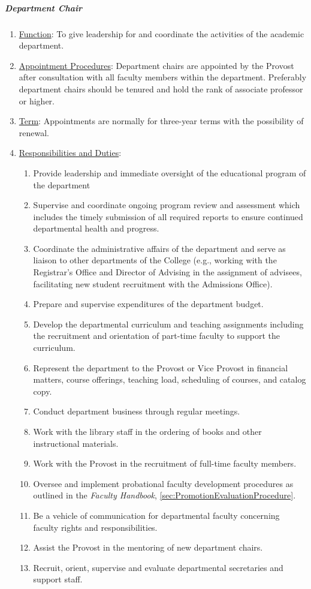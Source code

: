 				\subparagraph{Department Chair}
					\begin{enumerate}
						\item{\underline{Function}:  To give leadership for and coordinate the activities of the academic department.}
						\item{\underline{Appointment Procedures}:  Department chairs are appointed by the Provost after consultation with all faculty members within the department.  Preferably department chairs should be tenured and hold the rank of associate professor or higher.}
						\item{\underline{Term}:  Appointments are normally for three-year terms with the possibility of renewal.}
						\item{\underline{Responsibilities and Duties}:
							\begin{enumerate}
								\item{Provide leadership and immediate oversight of the educational program of the department}
								\item{Supervise and coordinate ongoing program review and assessment which includes the timely submission of all required reports to ensure continued departmental health and progress.}
								\item{Coordinate the administrative affairs of the department and serve as liaison to other departments of the College (e.g., working with the Registrar's Office and Director of Advising in the assignment of advisees, facilitating new student recruitment with the Admissions Office).}
								\item{Prepare and supervise expenditures of the department budget.}
								\item{Develop the departmental curriculum and teaching assignments including the recruitment and orientation of part-time faculty to support the curriculum.}
								\item{Represent the department to the Provost or Vice Provost in financial matters, course offerings, teaching load, scheduling of courses, and catalog copy.}
								\item{Conduct department business through regular meetings.}
								\item{Work with the library staff in the ordering of books and other instructional materials.}
								\item{Work with the Provost in the recruitment of full-time faculty members.}
								\item{Oversee and implement probational faculty development procedures as outlined in the \emph{Faculty Handbook}, \ref{sec:PromotionEvaluationProcedure}.}
								\item{Be a vehicle of communication for departmental faculty concerning faculty rights and responsibilities.}
								\item{Assist the Provost in the mentoring of new department chairs.}
								\item{Recruit, orient, supervise and evaluate departmental secretaries and support staff.}
							\end{enumerate}
						}
					\end{enumerate}
